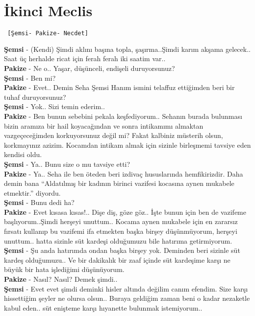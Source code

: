 \documentclass[]{book}
\begin{document}
\hypertarget{ikinci-meclis-1}{%
\section{İkinci Meclis}\label{ikinci-meclis-1}}

\begin{verbatim}
 [Şemsi- Pakize- Necdet]
\end{verbatim}

\textbf{Şemsi} - (Kendi) Şimdi aklını başına topla, şaşırma..Şimdi karım akşama gelecek.. Saat üç herhalde ricat için ferah ferah iki saatim var..\\
\textbf{Pakize} - Ne o.. Yaşar, düşünceli, endişeli duruyorsunuz?\\
\textbf{Şemsi} - Ben mi?\\
\textbf{Pakize} - Evet.. Demin Seha Şemsi Hanım ismini telaffuz ettiğimden beri bir tuhaf duruyorsunuz?\\
\textbf{Şemsi} - Yok.. Sizi temin ederim..\\
\textbf{Pakize} - Ben bunun sebebini pekala keşfediyorum.. Sehanın burada bulunması bizin aramıza bir hail koyacağından ve sonra intikamımı almaktan vazgeçeceğimden korkuyorsunuz değil mi? Fakat kalbiniz müsterih olsun, korkmayınız azizim. Kocamdan intikam almak için sizinle birleşmemi tavsiye eden kendisi oldu.\\
\textbf{Şemsi} - Ya.. Bunu size o mu tavsiye etti?\\
\textbf{Pakize} - Ya.. Seha ile ben öteden beri izdivaç hususlarında hemfikirizdir. Daha demin bana ``Aldatılmış bir kadının birinci vazifesi kocasına aynen mukabele etmektir.'' diyordu.\\
\textbf{Şemsi} - Bunu dedi ha?\\
\textbf{Pakize} - Evet kısasa kısas!.. Dişe diş, göze göz.. İşte bunun için ben de vazifeme başlıyorum..Şimdi herşeyi unuttum.. Kocama aynen mukabele için en zararsız fırsatı kullanıp bu vazifemi ifa etmekten başka birşey düşünmüyorum, herşeyi unuttum.. hatta sizinle süt kardeşi olduğumuzu bile hatırıma getirmiyorum.\\
\textbf{Şemsi} - Şu anda hatırımda ondan başka birşey yok. Deminden beri sizinle süt kardeş olduğumuzu.. Ve bir dakikalık bir zaaf içinde süt kardeşime karşı ne büyük bir hata işlediğimi düşünüyorum.\\
\textbf{Pakize} - Nasıl? Nasıl? Demek şimdi..\\
\textbf{Şemsi} - Evet evet şimdi deminki hisler altında değilim canım efendim. Size karşı hissettiğim şeyler ne olursa olsun.. Buraya geldiğim zaman beni o kadar nezaketle kabul eden.. süt enişteme karşı hıyanette bulunmak istemiyorum..\\
\end{document}

